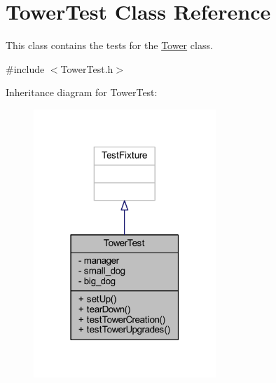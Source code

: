 \hypertarget{class_tower_test}{\section{Tower\+Test Class Reference}
\label{class_tower_test}
}


This class contains the tests for the \hyperlink{class_tower}{Tower} class.  




{\ttfamily \#include $<$Tower\+Test.\+h$>$}



Inheritance diagram for Tower\+Test\+:
\nopagebreak
\begin{figure}[H]
\begin{center}
\leavevmode
\includegraphics[width=195pt]{class_tower_test__inherit__graph}
\end{center}
\end{figure}


